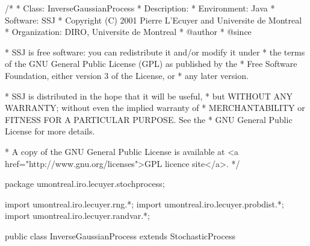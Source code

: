 \begin{code}
\begin{hide}
/*
 * Class:        InverseGaussianProcess
 * Description:  
 * Environment:  Java
 * Software:     SSJ 
 * Copyright (C) 2001  Pierre L'Ecuyer and Universite de Montreal
 * Organization: DIRO, Universite de Montreal
 * @author       
 * @since

 * SSJ is free software: you can redistribute it and/or modify it under
 * the terms of the GNU General Public License (GPL) as published by the
 * Free Software Foundation, either version 3 of the License, or
 * any later version.

 * SSJ is distributed in the hope that it will be useful,
 * but WITHOUT ANY WARRANTY; without even the implied warranty of
 * MERCHANTABILITY or FITNESS FOR A PARTICULAR PURPOSE.  See the
 * GNU General Public License for more details.

 * A copy of the GNU General Public License is available at
   <a href="http://www.gnu.org/licenses">GPL licence site</a>.
 */
\end{hide}
package umontreal.iro.lecuyer.stochprocess;\begin{hide}
import umontreal.iro.lecuyer.rng.*;
import umontreal.iro.lecuyer.probdist.*;
import umontreal.iro.lecuyer.randvar.*;

\end{hide}

public class InverseGaussianProcess extends StochasticProcess \begin{hide} {

    protected RandomStream       stream;

    protected double   delta;
    protected double   gamma;

    protected double   deltaOverGamma;
    protected double   deltaSquare;
    // mu and lambda are the common names of the params for InverseGaussianGen.
    protected double[] imu;
    protected double[] ilam;

    // Number of random streams needed by the current class
    // to generate an IG process.  For this class, = 1, for subclasses
    // will sometimes be, = 2.
    int numberOfRandomStreams;

\end{hide}
\end{code}
